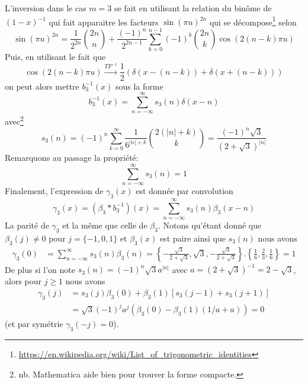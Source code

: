 \documentclass[11pt,twoside]{article}
\newcommand{\nn}{\nonumber}
\begin{document}
L'inversion dans le cas $m=3$ se fait en utilisant la relation du binôme de $(1-x)^{-1}$ qui fait apparaitre les facteurs  $\sin(\pi u)^{2n}$ qui se décompose\footnote{\url{https://en.wikipedia.org/wiki/List_of_trigonometric_identities}} selon
\begin{equation}
\sin(\pi u)^{2n} = \frac{1}{2^{2n}}\binom{2n}{n}+\frac{(-1)^n}{2^{2n-1}}\sum_{k=0}^{n-1} (-1)^k \binom{2n}{k}\cos(2(n-k)\pi u)
\end{equation}
Puis, en utilisant le fait que 
\begin{equation}
\cos(2(n-k)\pi u) \xrightarrow[]{TF^{-1}} \frac{1}{2}(\delta(x-(n-k))+\delta(x+(n-k)))
\end{equation}
on peut alors mettre $b^{-1}_3(x)$ sous la forme
\begin{equation}
b^{-1}_3(x) = \sum_{n=-\infty}^\infty s_3(n) \delta(x-n)
\end{equation}
avec\footnote{nb. Mathematica aide bien pour trouver la forme compacte.}
\begin{equation}
s_3(n) = (-1)^n \sum_{k=0}^\infty \frac{1}{6^{|n|+k}} \binom{2(|n|+k)}{k} =  \frac{(-1)^n\sqrt{3}}{(2+\sqrt{3})^{|n|}}
\end{equation}
Remarquons au passage la propriété:
\begin{equation}
\sum_{n=-\infty}^\infty s_3(n) = 1
\end{equation} 
Finalement, l'expression de $\gamma_3(x)$  est donnée par convolution
\begin{equation}
\gamma_3(x) = (\beta_3 \ast b^{-1}_3)(x) =  \sum_{n=-\infty}^\infty s_3(n) \beta_3(x-n)
\label{eq:gam3}
\end{equation}
La parité de $\gamma_3$ et la même que celle de $\beta_3$. Notons qu'étant donné que $\beta_3(j)\neq 0$ pour $j=\{-1,0,1\}$ et $\beta_3(x)$ est paire ainsi que $s_3(n)$ nous avons
\begin{align}
\gamma_3(0) &=\sum_{n=-\infty}^\infty s_3(n) \beta_3(n)
= \left\{-\frac{\sqrt{3}}{2+\sqrt{3}},\sqrt{3},-\frac{\sqrt{3}}{2+\sqrt{3}}\right\}.\left\{\frac{1}{6},\frac{2}{3},\frac{1}{6}\right\} = 1
\end{align}
De plus si l'on note $s_3(n)=(-1)^n\sqrt{3}a^{|n|}$ avec $a=(2+\sqrt{3})^{-1}=2-\sqrt{3}$, alors pour $j\geq 1$ nous avons
\begin{align}
\gamma_3(j) &= s_3(j)\beta_3(0) + \beta_3(1)[s_3(j-1)+s_3(j+1)]\nn \\
&= \sqrt{3} (-1)^j a^j (\beta_3(0)-\beta_3(1)(1/a+a)) = 0
\end{align}
(et par symétrie $\gamma_3(-j)=0$).  
\end{document}
